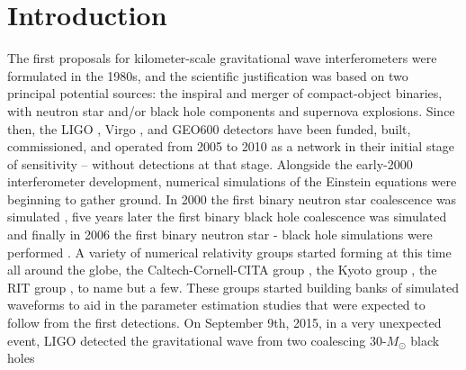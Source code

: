 \chapter{Introduction}
\label{chap:intro}


\cite{}
The first proposals for kilometer-scale gravitational wave interferometers were
formulated in the 1980s, and the scientific justification was based on two principal
potential sources:  the inspiral and merger of compact-object binaries, with neutron star and/or black hole components and supernova explosions. Since then, the LIGO \cite{ligo2018gwtc}, Virgo \cite{acernese2015advanced}, and GEO600 \cite{affeldt2014advanced} detectors have been funded, built, commissioned, and operated from 2005 to 2010 as a network in their initial stage of sensitivity – without detections at that stage. Alongside the early-2000 interferometer development, numerical simulations of the Einstein equations were beginning to gather ground. In 2000 the first binary neutron star coalescence was simulated \cite{shibata2000simulation}, five years later the first binary black hole coalescence was simulated \cite{pretorius2005a} and finally in 2006 the first binary neutron star - black hole simulations were performed \cite{shibata2011coalescence}. A variety of numerical relativity groups started forming at this time all around the globe, the Caltech-Cornell-CITA group \cite{sxswebsite},
the Kyoto group \cite{nagakura:2014hza}, the RIT group \cite{ritcatalog}, to name but a few. These groups started building banks of simulated waveforms
to aid in the parameter estimation studies that were expected to follow from the first detections. On September 9th, 2015, in a very unexpected event, LIGO detected the gravitational wave from two coalescing 30-$M_\odot$ black holes
